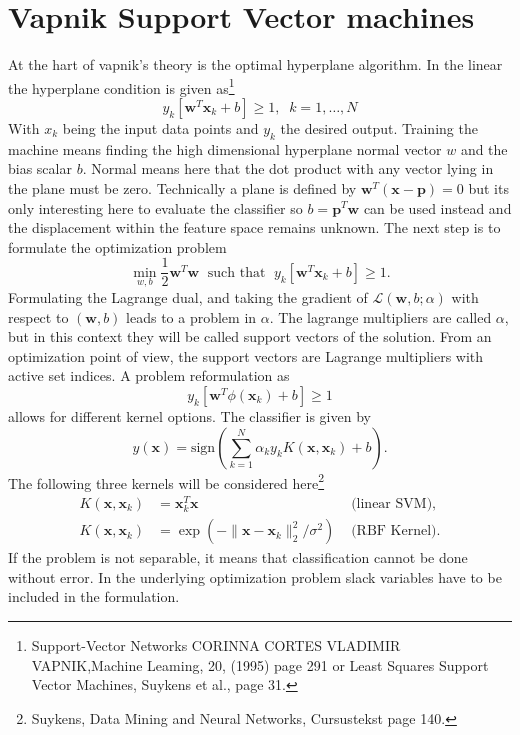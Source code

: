 \section{Vapnik Support Vector machines}
At the hart of vapnik's theory is the optimal hyperplane algorithm. In the linear the hyperplane condition is given as\footnote{Support-Vector Networks
CORINNA CORTES VLADIMIR VAPNIK,Machine Leaming, 20, (1995) page 291 or Least Squares Support Vector Machines, Suykens et al., page 31.}
\begin{equation}
y_k [\mathbf{w}^T \mathbf{x}_k + b] \geq 1, \;\; k = 1,\dots,N
\end{equation}
With $x_k$ being the input data points and $y_k$ the desired output. Training the machine means finding the high dimensional hyperplane normal vector $w$ and the bias scalar $b$. Normal means here that the dot product with any vector lying in the plane must be zero. Technically a plane is defined by $\mathbf{w}^T(\mathbf{x} - \mathbf{p}) = 0$ but its only interesting here to evaluate the classifier so $b = \mathbf{p}^T \mathbf{w}$ can be used instead and the displacement within the feature space remains unknown.
The next step is to formulate the optimization problem
\begin{equation}
\min_{w,b} \frac{1}{2} \mathbf{w}^T \mathbf{w} \;\text{ such that }\; y_k [\mathbf{w}^T \mathbf{x}_k + b] \geq 1.
\end{equation}
Formulating the Lagrange dual, and taking the gradient of $\mathcal{L}(\mathbf{w},b;\alpha)$ with respect to $(\mathbf{w},b)$ leads to a problem in $\alpha$. The lagrange multipliers are called $\alpha$, but in this context they will be called support vectors of the solution. From an optimization point of view, the support vectors are Lagrange multipliers with active set indices. A problem reformulation as
\begin{equation}
y_k [\mathbf{w}^T \phi(\mathbf{x}_k) + b] \geq 1
\end{equation}
allows for different kernel options. The classifier is given by
\begin{equation}
y(\mathbf{x}) = \text{sign}(\sum^N_{k=1} \alpha_k y_k K(\mathbf{x},\mathbf{x}_k) + b).
\end{equation}
The following three kernels will be considered here\footnote{Suykens, Data Mining and Neural Networks, Cursustekst page 140.}
\begin{align}
K(\mathbf{x},\mathbf{x}_k)  &= \mathbf{x}_k^T \mathbf{x} &\text{  (linear SVM)}, \\
K(\mathbf{x}, \mathbf{x}_k) &= \exp (-\| \mathbf{x} - \mathbf{x}_k \|^2_2 / \sigma^2) &\text{  (RBF Kernel)}.
\end{align}
If the problem is not separable, it means that classification cannot be done without error. In the underlying optimization problem slack variables have to be included in the formulation. 



